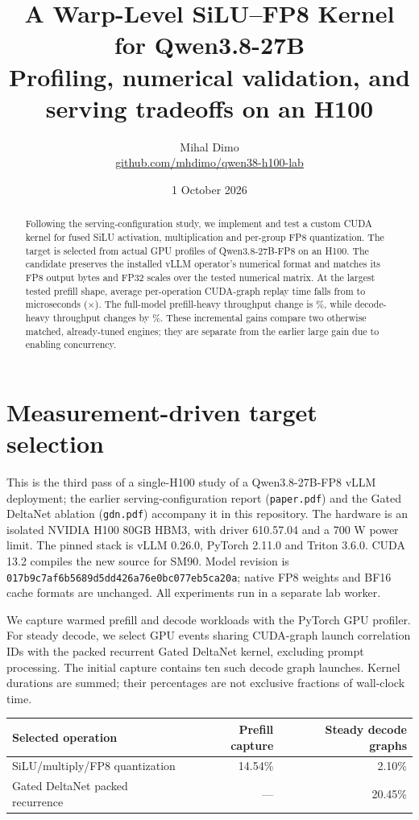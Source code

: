 \documentclass[10pt,a4paper]{article}
\title{\vspace{-10mm}\textbf{A Warp-Level SiLU--FP8 Kernel for Qwen3.8-27B}\\[3pt]
\large Profiling, numerical validation, and serving tradeoffs on an H100}
\author{Mihal Dimo\\\small\href{https://github.com/mhdimo/qwen38-h100-lab}{github.com/mhdimo/qwen38-h100-lab}}
\date{1 October 2026}
\begin{document}
\maketitle\thispagestyle{fancy}\vspace{-6mm}
\begin{abstract}
Following the serving-configuration study, we implement and test a custom CUDA
kernel for fused SiLU activation, multiplication and per-group FP8 quantization.
The target is selected from actual GPU profiles of Qwen3.8-27B-FP8 on an H100.
The candidate preserves the installed vLLM operator's numerical format and
matches its FP8 output bytes and FP32 scales over the tested numerical matrix.
At the largest tested prefill shape, average per-operation CUDA-graph replay time
falls from \MicroBase{} to \MicroCustom{} microseconds (\MicroSpeedup{}$\times$).
The full-model prefill-heavy throughput change is \PrefillKernelGain{}\%, while
decode-heavy throughput changes by \DecodeKernelGain{}\%.
These incremental gains compare two otherwise matched, already-tuned engines;
they are separate from the earlier large gain due to enabling concurrency.
\end{abstract}

\section{Measurement-driven target selection}
This is the third pass of a single-H100 study of a Qwen3.8-27B-FP8 vLLM
deployment; the earlier serving-configuration report (\texttt{paper.pdf}) and
the Gated DeltaNet ablation (\texttt{gdn.pdf}) accompany it in this repository.
The hardware is an isolated NVIDIA H100 80GB HBM3, with driver 610.57.04 and a
700 W power limit. The pinned stack is vLLM 0.26.0, PyTorch 2.11.0 and Triton 3.6.0.
CUDA 13.2 compiles the new source for SM90. Model revision is
\texttt{017b9c7af6b5689d5dd426a76e0bc077eb5ca20a}; native FP8 weights and BF16
cache formats are unchanged. All experiments run in a separate lab worker.

We capture warmed prefill and decode workloads with the PyTorch GPU profiler.
For steady decode, we select GPU events sharing CUDA-graph launch correlation IDs
with the packed recurrent Gated DeltaNet kernel, excluding prompt processing.
The initial capture contains ten such decode graph launches. Kernel durations
are summed; their percentages are not exclusive fractions of wall-clock time.

\begin{center}\small
\begin{tabular}{@{}lrr@{}}\toprule
Selected operation & Prefill capture & Steady decode graphs \\\midrule
SiLU/multiply/FP8 quantization & 14.54\% & 2.10\% \\
Gated DeltaNet packed recurrence & --- & 20.45\% \\
\bottomrule\end{tabular}
\end{center}
\end{document}

